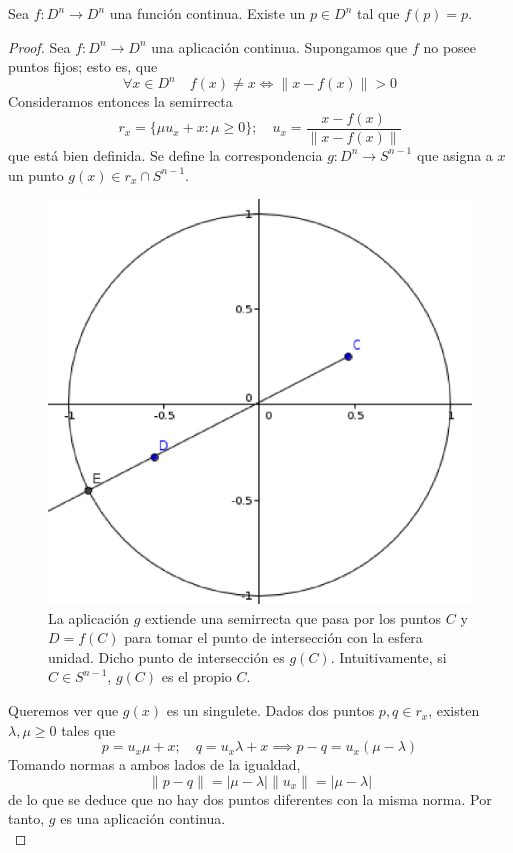 \begin{teo} Sea $f: D^n \longrightarrow D^n$ una función continua. Existe un $p \in D^n$ tal que $f(p)=p$.\end{teo}

\begin{proof}
Sea $f: D^n \longrightarrow D^n$ una aplicación continua. Supongamos que $f$ no posee puntos fijos; esto es, que $$\forall x \in D^n \quad f(x)\neq x \iff \|x-f(x)\| > 0$$ Consideramos entonces la semirrecta $$r_x=\{\mu u_x+x: \mu \geq 0\}; \quad u_x=\frac{x-f(x)}{\|x-f(x)\|}$$ que está bien definida. Se define la correspondencia $g: D^n \longrightarrow S^{n-1}$ que asigna a $x$ un punto $g(x)\in r_x\cap S^{n-1}$.
\\

\begin{figure}[h]
\centering
\includegraphics[scale=0.6]{Figures/Brouwer.eps}
\caption{La aplicación $g$ extiende una semirrecta que pasa por los puntos $C$ y $D=f(C)$ para tomar el punto de intersección con la esfera unidad. Dicho punto de intersección es $g(C)$. Intuitivamente, si $C \in S^{n-1}$, $g(C)$ es el propio $C$.}
\end{figure}

Queremos ver que $g(x)$ es un singulete. Dados dos puntos $p,q \in r_x$, existen $\lambda, \mu \geq 0$ tales que $$p=u_x\mu+x; \quad q=u_x\lambda+x \implies p-q=u_x(\mu-\lambda)$$ Tomando normas a ambos lados de la igualdad, \[\|p-q\|=|\mu-\lambda|\|u_x\|=|\mu-\lambda|\] de lo que se deduce que no hay dos puntos diferentes con la misma norma.
Por tanto, $g$ es una aplicación continua.
\\


\end{proof}
